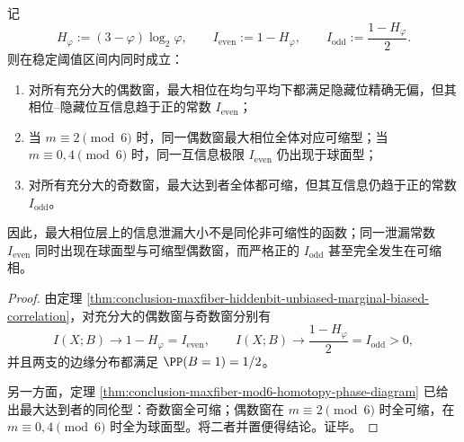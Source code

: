 \begin{theorem}[最大相位的信息泄漏与同伦复杂度严格脱钩]\label{thm:conclusion-maxfiber-leakage-decouples-from-homotopy}
记
\[
H_\varphi:=(3-\varphi)\log_2\varphi,
\qquad
I_{\mathrm{even}}:=1-H_\varphi,
\qquad
I_{\mathrm{odd}}:=\frac{1-H_\varphi}{2}.
\]
则在稳定阈值区间内同时成立：
\begin{enumerate}
\normalfont
  \item 对所有充分大的偶数窗，最大相位在均匀平均下都满足隐藏位精确无偏，但其相位--隐藏位互信息趋于正的常数 \(I_{\mathrm{even}}\)；
  \item 当 \(m\equiv 2\pmod 6\) 时，同一偶数窗最大相位全体对应可缩型；当 \(m\equiv 0,4\pmod 6\) 时，同一互信息极限 \(I_{\mathrm{even}}\) 仍出现于球面型；
  \item 对所有充分大的奇数窗，最大达到者全体都可缩，但其互信息仍趋于正的常数 \(I_{\mathrm{odd}}\)。
\end{enumerate}
因此，最大相位层上的信息泄漏大小不是同伦非可缩性的函数；同一泄漏常数 \(I_{\mathrm{even}}\) 同时出现在球面型与可缩型偶数窗，而严格正的 \(I_{\mathrm{odd}}\) 甚至完全发生在可缩相。
\end{theorem}
\begin{proof}
由定理 \ref{thm:conclusion-maxfiber-hiddenbit-unbiased-marginal-biased-correlation}，对充分大的偶数窗与奇数窗分别有
\[
I(X;B)\longrightarrow 1-H_\varphi=I_{\mathrm{even}},
\qquad
I(X;B)\longrightarrow \frac{1-H_\varphi}{2}=I_{\mathrm{odd}}>0,
\]
并且两支的边缘分布都满足 \(\PP(B=1)=1/2\)。

另一方面，定理 \ref{thm:conclusion-maxfiber-mod6-homotopy-phase-diagram} 已给出最大达到者的同伦型：奇数窗全可缩；偶数窗在 \(m\equiv 2\pmod 6\) 时全可缩，在 \(m\equiv 0,4\pmod 6\) 时全为球面型。将二者并置便得结论。证毕。
\end{proof}

